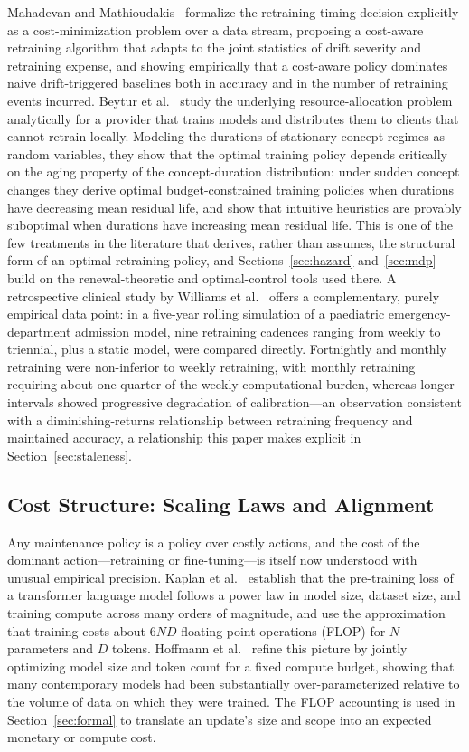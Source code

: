\documentclass[electronics,article,submit,pdftex,moreauthors]{Definitions/mdpi}
\begin{document}
Mahadevan and Mathioudakis~\cite{Mahadevan2023} formalize the retraining-timing decision explicitly as a cost-minimization problem over a data stream, proposing a cost-aware retraining algorithm that adapts to the joint statistics of drift severity and retraining expense, and showing empirically that a cost-aware policy dominates naive drift-triggered baselines both in accuracy and in the number of retraining events incurred. Beytur et al.~\cite{Beytur2025} study the underlying resource-allocation problem analytically for a provider that trains models and distributes them to clients that cannot retrain locally. Modeling the durations of stationary concept regimes as random variables, they show that the optimal training policy depends critically on the aging property of the concept-duration distribution: under sudden concept changes they derive optimal budget-constrained training policies when durations have decreasing mean residual life, and show that intuitive heuristics are provably suboptimal when durations have increasing mean residual life. This is one of the few treatments in the literature that derives, rather than assumes, the structural form of an optimal retraining policy, and Sections~\ref{sec:hazard} and~\ref{sec:mdp} build on the renewal-theoretic and optimal-control tools used there. A retrospective clinical study by Williams et al.~\cite{Williams2026} offers a complementary, purely empirical data point: in a five-year rolling simulation of a paediatric emergency-department admission model, nine retraining cadences ranging from weekly to triennial, plus a static model, were compared directly. Fortnightly and monthly retraining were non-inferior to weekly retraining, with monthly retraining requiring about one quarter of the weekly computational burden, whereas longer intervals showed progressive degradation of calibration---an observation consistent with a diminishing-returns relationship between retraining frequency and maintained accuracy, a relationship this paper makes explicit in Section~\ref{sec:staleness}.

\subsection{Cost Structure: Scaling Laws and Alignment}

Any maintenance policy is a policy over costly actions, and the cost of the dominant action---retraining or fine-tuning---is itself now understood with unusual empirical precision. Kaplan et al.~\cite{Kaplan2020} establish that the pre-training loss of a transformer language model follows a power law in model size, dataset size, and training compute across many orders of magnitude, and use the approximation that training costs about $6ND$ floating-point operations (FLOP) for $N$ parameters and $D$ tokens. Hoffmann et al.~\cite{Hoffmann2022} refine this picture by jointly optimizing model size and token count for a fixed compute budget, showing that many contemporary models had been substantially over-parameterized relative to the volume of data on which they were trained. The FLOP accounting is used in Section~\ref{sec:formal} to translate an update's size and scope into an expected monetary or compute cost.
\end{document}
